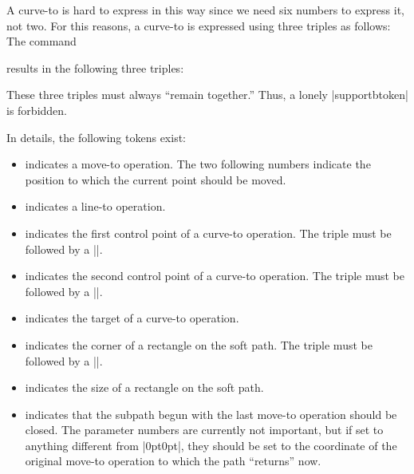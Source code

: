 A curve-to is hard to express in this way since we need six numbers to
express it, not two. For this reasons, a curve-to is expressed using
three triples as follows: The command
\begin{codeexample}
\pgfsyssoftpath@curveto{1bp}{2bp}{3bp}{4bp}{5bp}{6bp}
\end{codeexample}
\noindent
results in the following three triples:
\begin{codeexample}
\pgfsyssoftpath@curvetosupportatoken{1bp}{2bp}
\pgfsyssoftpath@curvetosupportbtoken{3bp}{4bp}
\pgfsyssoftpath@curvetotoken{5bp}{6bp}
\end{codeexample}

These three triples must always ``remain together.'' Thus, a lonely
|supportbtoken| is forbidden.

In details, the following tokens exist:
\begin{itemize}
\item
  \declare{|\pgfsyssoftpath@movetotoken|} indicates a move-to
  operation. The two following numbers indicate the position to which
  the current point should be moved.
\item
  \declare{|\pgfsyssoftpath@linetotoken|} indicates a line-to
  operation.
\item
  \declare{|\pgfsyssoftpath@curvetosupportatoken|} indicates the first
  control point of a curve-to operation. The triple must be followed
  by a |\pgfsyssoftpath@curvetosupportbtoken|.
\item
  \declare{|\pgfsyssoftpath@curvetosupportbtoken|} indicates the second
  control point of a curve-to operation. The triple must be followed
  by a |\pgfsyssoftpath@curvetotoken|.
\item
  \declare{|\pgfsyssoftpath@curvetotoken|} indicates the target
  of a curve-to operation.
\item
  \declare{|\pgfsyssoftpath@rectcornertoken|} indicates the corner of
  a rectangle on the soft path. The triple must be followed
  by a |\pgfsyssoftpath@rectsizetoken|.
\item
  \declare{|\pgfsyssoftpath@rectsizetoken|} indicates the size of
  a rectangle on the soft path.
\item
  \declare{|\pgfsyssoftpath@closepath|} indicates that the subpath
  begun with the last move-to operation should be closed. The parameter
  numbers are currently not important, but if set to anything
  different from |{0pt}{0pt}|, they should be set to the coordinate of
  the original move-to operation to which the path ``returns'' now.
\end{itemize}




